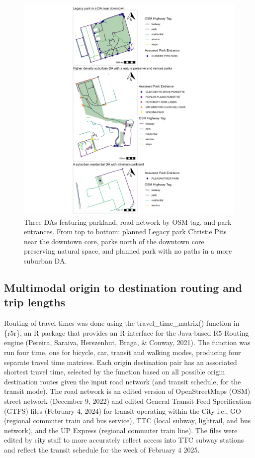 \documentclass[
11pt, %
oneside, %
english, %
singlespacing, %
]{macthesis} %
\begin{document}
\begin{figure}

{\centering \includegraphics[width=6in]{./data/figures/chp3-park_entrance_example_plot} 

}

\caption{\label{fig:chp3-park_entrance_example_plot} Three DAs featuring parkland, road network by OSM tag, and park entrances. From top to bottom: planned Legacy park Christie Pits near the downtown core, parks north of the downtown core preserving natural space, and planned park with no paths in a more suburban DA.}\label{fig:unnamed-chunk-46}
\end{figure}

\subsection{Multimodal origin to destination routing and trip lengths}\label{multimodal-origin-to-destination-routing-and-trip-lengths}

Routing of travel times was done using the travel\_time\_matrix() function in \{r5r\}, an R package that provides an R-interface for the Java-based R5 Routing engine (Pereira, Saraiva, Herszenhut, Braga, \& Conway, 2021). The function was run four time, one for bicycle, car, transit and walking modes, producing four separate travel time matrices. Each origin destination pair has an associated shortest travel time, selected by the function based on all possible origin destination routes given the input road network (and transit schedule, for the transit mode). The road network is an edited version of OpenStreetMaps (OSM) street network (December 9, 2022) and edited General Transit Feed Specification (GTFS) files (February 4, 2024) for transit operating within the City i.e., GO (regional commuter train and bus service), TTC (local subway, lightrail, and bus network), and the UP Express (regional commuter train line). The files were edited by city staff to more accurately reflect access into TTC subway stations and reflect the transit schedule for the week of February 4 2025.
\end{document}
